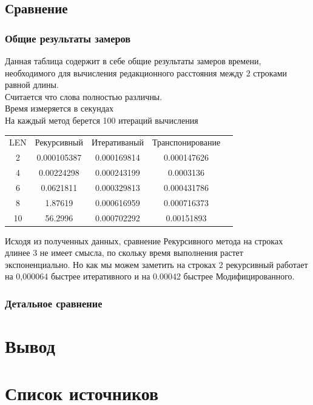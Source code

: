 \documentclass[a4paper, 14pt]{article}
\begin{document}
	\subsection{Сравнение}
	
	\subsubsection{Общие результаты замеров}
	
	Данная таблица содержит в себе общие результаты замеров времени, необходимого для вычисления
	редакционного расстояния между 2 строками равной длины. \\
	Считается что слова полностью различны. \\
	Время измеряется в секундах \\
	На каждый метод берется 100 итераций вычисления \\
	
	\begin{tabular}{|c | c | c | c | c |}
		\hline 
		LEN	& Рекурсивный & Итеративаный & Транспонирование \\
		2 & 0.000105387 & 0.000169814 & 0.000147626 \\
		4 & 0.00224298 & 0.000243199 & 0.0003136 \\
		6 & 0.0621811 & 0.000329813 & 0.000431786 \\
		8 & 1.87619 & 0.000616959 & 0.000716373 \\
		10 & 56.2996 & 0.000702292 & 0.00151893 \\
		\hline
	\end{tabular}
	
	Исходя из полученных данных, сравнение Рекурсивного метода на строках длинее 3 не имеет смысла, по скольку время выполнения растет экспоненциально. Но как мы можем заметить на строках 2 рекурсивный работает на 0,000064 быстрее итеративного и на 0.00042 быстрее Модифицированного.
	
	\subsubsection{Детальное сравнение}
	
	
	
	\newpage
	\section{Вывод}
	
	
	\newpage
	\section{Список источников}
	\printbibliography
	
	
\end{document}
